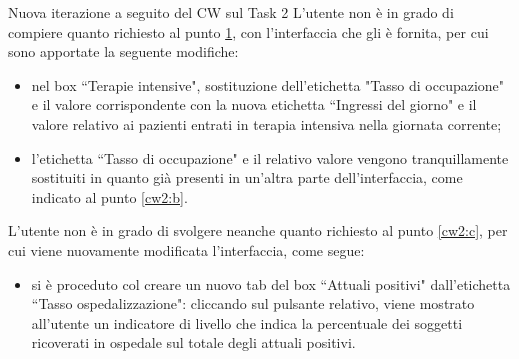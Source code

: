 \begin{bclogo}{Nuova iterazione a seguito del CW sul Task 2}
    L'utente non è in grado di compiere quanto richiesto al punto \hyperref[cw2:a]{1}, con l'interfaccia che gli è fornita, per cui sono apportate la seguente modifiche:
    \begin{itemize}
        \item nel box ``Terapie intensive", sostituzione dell'etichetta "Tasso di occupazione" e il valore corrispondente con la nuova etichetta ``Ingressi del giorno" e il valore relativo ai pazienti entrati in terapia intensiva nella giornata corrente;
        \item l'etichetta ``Tasso di occupazione" e il relativo valore vengono tranquillamente sostituiti in quanto già presenti in un'altra parte dell'interfaccia, come indicato al punto \ref{cw2:b}.
    \end{itemize}
   L'utente non è in grado di svolgere neanche quanto richiesto  al punto \ref{cw2:c}, per cui viene nuovamente modificata l'interfaccia, come segue:
    \begin{itemize}
        \item si è proceduto col creare un nuovo tab del box ``Attuali positivi" dall'etichetta ``Tasso ospedalizzazione": cliccando sul pulsante relativo, viene mostrato all'utente un indicatore di livello che indica la percentuale dei soggetti ricoverati in ospedale sul totale degli attuali positivi.
    \end{itemize}
\end{bclogo}